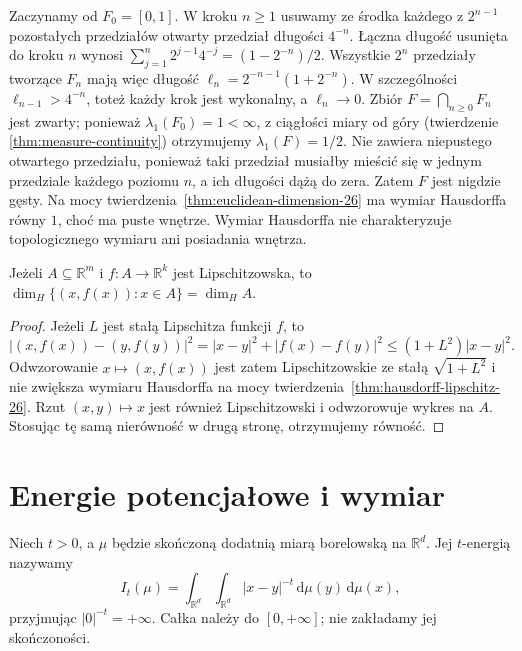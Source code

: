 \begin{przyklad}
Zaczynamy od $F_0=[0,1]$. W kroku $n\ge1$
usuwamy ze środka każdego z $2^{n-1}$ pozostałych
przedziałów otwarty przedział długości $4^{-n}$.
Łączna długość usunięta do kroku $n$ wynosi
$\sum_{j=1}^n2^{j-1}4^{-j}=(1-2^{-n})/2$.
Wszystkie $2^n$ przedziały tworzące $F_n$ mają więc
długość $\ell_n=2^{-n-1}(1+2^{-n})$.
W szczególności $\ell_{n-1}>4^{-n}$, toteż każdy
krok jest wykonalny, a $\ell_n\to0$.
Zbiór $F=\bigcap_{n\ge0}F_n$ jest zwarty; ponieważ
$\lambda_1(F_0)=1<\infty$, z ciągłości miary od góry
(twierdzenie \ref{thm:measure-continuity}) otrzymujemy $\lambda_1(F)=1/2$.
Nie zawiera niepustego otwartego przedziału, ponieważ
taki przedział musiałby mieścić się w jednym przedziale
każdego poziomu $n$, a ich długości dążą do zera.
Zatem $F$ jest nigdzie gęsty. Na mocy twierdzenia~\ref{thm:euclidean-dimension-26}
ma wymiar Hausdorffa równy $1$, choć ma puste wnętrze.
Wymiar Hausdorffa nie charakteryzuje topologicznego
wymiaru ani posiadania wnętrza.
\end{przyklad}

\begin{wniosek}
\label{cor:graph-dimension-26}
Jeżeli $A\subseteq\mathbb R^m$ i
$f:A\to\mathbb R^k$ jest Lipschitzowska, to
$\dim_H\{(x,f(x)):x\in A\}=\dim_HA$.
\end{wniosek}
\begin{proof}
Jeżeli $L$ jest stałą Lipschitza funkcji $f$, to
\[
 |(x,f(x))-(y,f(y))|^2=|x-y|^2+|f(x)-f(y)|^2
 \le (1+L^2)|x-y|^2.
\]
Odwzorowanie $x\mapsto(x,f(x))$ jest zatem Lipschitzowskie
ze stałą $\sqrt{1+L^2}$ i nie zwiększa wymiaru Hausdorffa na mocy
twierdzenia~\ref{thm:hausdorff-lipschitz-26}.
Rzut $(x,y)\mapsto x$ jest również Lipschitzowski
i odwzorowuje wykres na $A$. Stosując tę samą
nierówność w drugą stronę, otrzymujemy równość.
\end{proof}

\section{Energie potencjałowe i wymiar}
\begin{definicja}
\label{def:energy-26}
Niech $t>0$, a $\mu$ będzie skończoną dodatnią miarą
borelowską na $\mathbb R^d$. Jej $t$-energią nazywamy
\[
 I_t(\mu)=\int_{\mathbb R^d}\!\int_{\mathbb R^d}
 |x-y|^{-t}\,\mathrm d\mu(y)\,\mathrm d\mu(x),
\]
przyjmując $|0|^{-t}=+\infty$. Całka należy do
$[0,+\infty]$; nie zakładamy jej skończoności.
\end{definicja}

